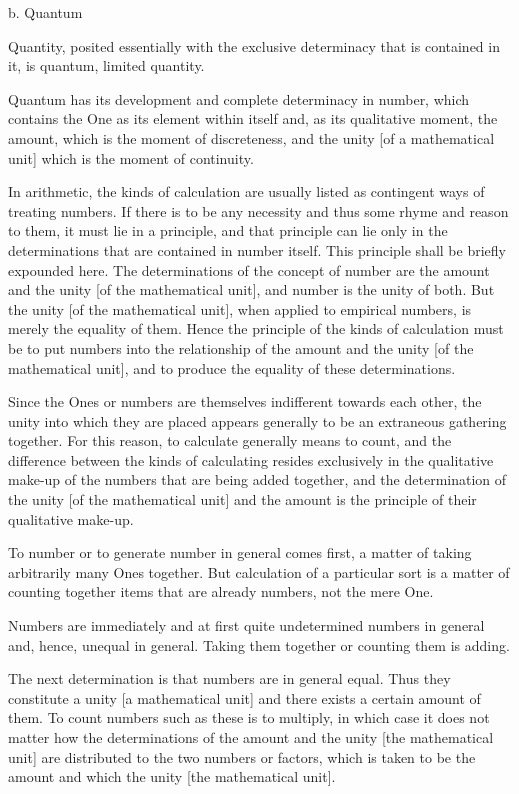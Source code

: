 b. Quantum

Quantity, posited essentially with the exclusive determinacy
that is contained in it, is quantum, limited quantity.

Quantum has its development and complete determinacy in number,
which contains the One as its element within itself
and, as its qualitative moment, the amount,
which is the moment of discreteness,
and the unity [of a mathematical unit]
which is the moment of continuity.

In arithmetic, the kinds of calculation are
usually listed as contingent ways of treating numbers.
If there is to be any necessity
and thus some rhyme and reason to them,
it must lie in a principle,
and that principle can lie only
in the determinations that are
contained in number itself.
This principle shall be briefly expounded here.
The determinations of the concept of number are
the amount and the unity [of the mathematical unit],
and number is the unity of both.
But the unity [of the mathematical unit],
when applied to empirical numbers,
is merely the equality of them.
Hence the principle of the kinds of calculation must be
to put numbers into the relationship of
the amount and the unity [of the mathematical unit],
and to produce the equality of these determinations.

Since the Ones or numbers are themselves indifferent towards
each other, the unity into which they are placed appears generally
to be an extraneous gathering together.
For this reason, to calculate generally means to count,
and the difference between the kinds of calculating
resides exclusively in the qualitative make-up of
the numbers that are being added together,
and the determination of the unity [of the mathematical unit]
and the amount is the principle of their qualitative make-up.

To number or to generate number in general comes first,
a matter of taking arbitrarily many Ones together.
But calculation of a particular sort is a matter of
counting together items that are already numbers,
not the mere One.

Numbers are immediately and at first
quite undetermined numbers in general
and, hence, unequal in general.
Taking them together or counting them is adding.

The next determination is that
numbers are in general equal.
Thus they constitute a unity [a mathematical unit]
and there exists a certain amount of them.
To count numbers such as these is to multiply,
in which case it does not matter how the determinations
of the amount and the unity [the mathematical unit] are distributed
to the two numbers or factors,
which is taken to be the amount
and which the unity [the mathematical unit].

